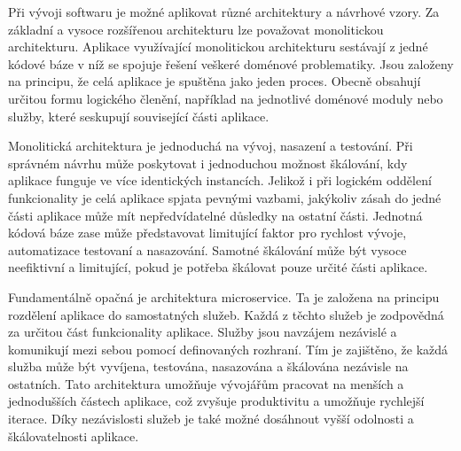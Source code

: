 

Při vývoji softwaru je možné aplikovat různé architektury a návrhové vzory. Za základní a vysoce rozšířenou architekturu lze považovat monolitickou architekturu. Aplikace využívající monolitickou architekturu sestávají z jedné kódové báze v níž se spojuje řešení veškeré doménové problematiky. Jsou založeny na principu, že celá aplikace je spuštěna jako jeden proces. Obecně obsahují určitou formu logického členění, například na jednotlivé doménové moduly nebo služby, které seskupují související části aplikace. \cite{Williams2023} 


Monolitická architektura je jednoduchá na vývoj, nasazení a testování. Při správném návrhu může poskytovat i jednoduchou možnost škálování, kdy aplikace funguje ve více identických instancích. \cite{Richardson2018} Jelikož i při logickém oddělení funkcionality je celá aplikace spjata pevnými vazbami, jakýkoliv zásah do jedné části aplikace může mít nepředvídatelné důsledky na ostatní části. Jednotná kódová báze zase může představovat limitující faktor pro rychlost vývoje, automatizace testovaní a nasazování. Samotné škálování může být vysoce neefiktivní a limitující, pokud je potřeba škálovat pouze určité části aplikace. \cite{Richardson2018}

Fundamentálně opačná je architektura microservice. Ta je založena na principu rozdělení aplikace do samostatných služeb. Každá z těchto služeb je zodpovědná za určitou část funkcionality aplikace. Služby jsou navzájem nezávislé a komunikují mezi sebou pomocí definovaných rozhraní. Tím je zajištěno, že každá služba může být vyvíjena, testována, nasazována a škálována nezávisle na ostatních. Tato architektura umožňuje vývojářům pracovat na menších a jednodušších částech aplikace, což zvyšuje produktivitu a umožňuje rychlejší iterace. Díky nezávislosti služeb je také možné dosáhnout vyšší odolnosti a škálovatelnosti aplikace. \cite{Richardson2018}



